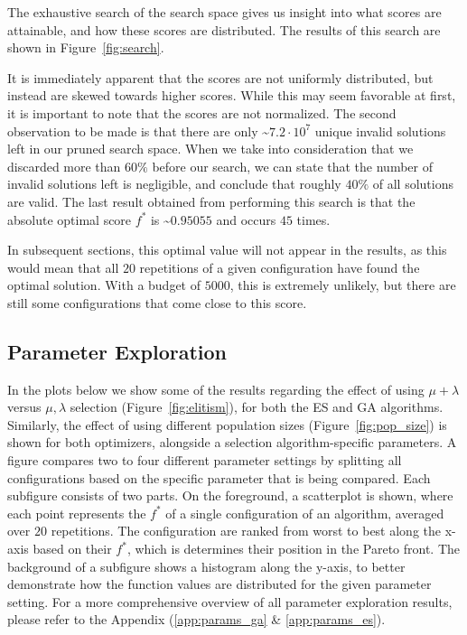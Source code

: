\documentclass{article}
\begin{document}
The exhaustive search of the search space gives us insight into what scores are attainable, and how these scores are distributed.
The results of this search are shown in Figure~\ref{fig:search}.

It is immediately apparent that the scores are not uniformly distributed, but instead are skewed towards higher scores.
While this may seem favorable at first, it is important to note that the scores are not normalized.
The second observation to be made is that there are only \textasciitilde $7.2 \cdot 10^7$ unique invalid solutions left in our pruned search space.
When we take into consideration that we discarded more than $60\%$ before our search, we can state that the number of invalid solutions left is negligible, and conclude that roughly $40\%$ of all solutions are valid.
The last result obtained from performing this search is that the absolute optimal score $f^*$ is \textasciitilde $0.95055$ and occurs $45$ times.

In subsequent sections, this optimal value will not appear in the results, as this would mean that all $20$ repetitions of a given configuration have found the optimal solution.
With a budget of $5000$, this is extremely unlikely, but there are still some configurations that come close to this score.

\newpage

\subsection*{Parameter Exploration}

In the plots below we show some of the results regarding the effect of using $\mu + \lambda$ versus $\mu, \lambda$ selection (Figure~\ref{fig:elitism}), for both the ES and GA algorithms.
Similarly, the effect of using different population sizes (Figure~\ref{fig:pop_size}) is shown for both optimizers, alongside a selection algorithm-specific parameters.
A figure compares two to four different parameter settings by splitting all configurations based on the specific parameter that is being compared.
Each subfigure consists of two parts.
On the foreground, a scatterplot is shown, where each point represents the $f^*$ of a single configuration of an algorithm, averaged over $20$ repetitions.
The configuration are ranked from worst to best along the x-axis based on their $f^*$, which is determines their position in the Pareto front.
The background of a subfigure shows a histogram along the y-axis, to better demonstrate how the function values are distributed for the given parameter setting.
For a more comprehensive overview of all parameter exploration results, please refer to the Appendix (\ref{app:params_ga} \& \ref{app:params_es}).
\end{document}
